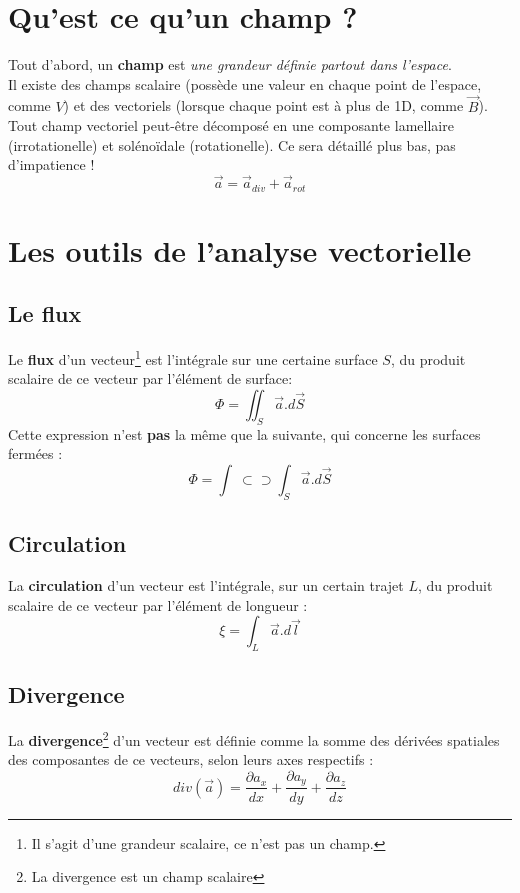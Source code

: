 \documentclass	[11pt, a4paper, openany]{book}
\newcommand{\oiint}{\int\!\!\!\!\!\!\! \:\!\subset\!\!\supset\!\!\!\!\!\!\!\int}
\begin{document}
		\section{Qu'est ce qu'un champ ?}
		Tout d'abord, un \textbf{champ} est \textit{une grandeur définie partout dans l'espace}.\\
		Il existe des champs scalaire (possède une valeur en chaque point de l'espace, comme $V$) et des vectoriels (lorsque chaque point est à plus de 1D, comme $\vec{B}$).\\
		Tout champ vectoriel peut-être décomposé en une composante lamellaire (irrotationelle) et solénoïdale (rotationelle). Ce sera détaillé plus bas, pas d'impatience ! 
		\begin{equation}
			\vec{a} = \vec{a}_{div} + \vec{a}_{rot}
		\end{equation}
		
		\section{Les outils de l'analyse vectorielle}
		\subsection{Le flux}
		Le \textbf{flux} d'un vecteur\footnote{Il s'agit d'une grandeur scalaire, ce n'est pas un champ.} est l'intégrale sur une certaine surface $S$, du produit scalaire de ce vecteur par l'élément de surface:
		\begin{equation}
			\Phi = \iint_S \vec{a}.d\vec{S}
		\end{equation}
		Cette expression n'est \textbf{pas} la même que la suivante, qui concerne les surfaces fermées :
		\begin{equation}
			\Phi = \oiint_S \vec{a}.d\vec{S}
		\end{equation}
		
		
		\subsection{Circulation}
		La \textbf{circulation} d'un vecteur est l'intégrale, sur un certain trajet $L$, du produit scalaire de ce vecteur par l'élément de longueur :
		\begin{equation}
			\xi = \int_L \vec{a}.d\vec{l}
		\end{equation}
		
		\subsection{Divergence}
		La \textbf{divergence}\footnote{La divergence est un champ scalaire} d'un vecteur est définie comme la somme des dérivées spatiales des composantes de ce vecteurs, selon leurs axes respectifs :
		\begin{equation}
			div(\vec{a}) = \frac{\partial a_x}{dx} + \frac{\partial a_y}{dy} + \frac{\partial a_z}{dz}
		\end{equation}
		
\end{document}
